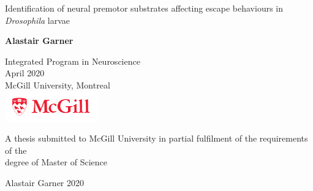 \begin{titlepage}
  \begin{center}
    \vspace*{1cm}

    {\LARGE\textsf{Identification of neural premotor substrates affecting escape behaviours in \textit{Drosophila} larvae}\par}

    \vspace{2.0cm}
    
    {\large\textbf{Alastair Garner}\par}

    \vspace{2.0cm}
    
    Integrated Program in Neuroscience\\
    April 2020\\
    McGill University, Montreal\\

    \includegraphics[width=4cm]{./mcgill_sig_red.png}

    \vfill

    {A thesis submitted to McGill University in partial fulfilment of the requirements of the\\
    degree of Master of Science \par}

    \vspace{0.2cm}

    {\textcopyright Alastair Garner 2020 \par}
  \end{center} 
\end{titlepage}
